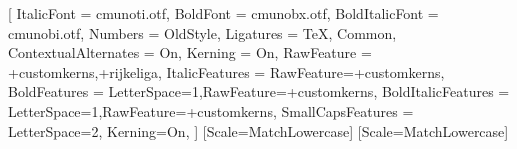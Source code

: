 \setmainfont{cmunorm.otf}[
  ItalicFont = cmunoti.otf,
  BoldFont = cmunobx.otf,
  BoldItalicFont = cmunobi.otf,
  Numbers = OldStyle,
  Ligatures = {TeX, Common},
  ContextualAlternates = On,
  Kerning = On,
  RawFeature = {+customkerns,+rijkeliga},
  ItalicFeatures = {RawFeature={+customkerns}},
  BoldFeatures = {LetterSpace=1,RawFeature={+customkerns}},
  BoldItalicFeatures = {LetterSpace=1,RawFeature={+customkerns}},
  SmallCapsFeatures = {LetterSpace=2, Kerning=On},
]
\setsansfont{TeX Gyre Heros}[Scale=MatchLowercase]
\setmonofont{Inconsolatazi4}[Scale=MatchLowercase]
\linespread{1.08}

\newcommand{\VersionFontName}{CMU Concrete}






